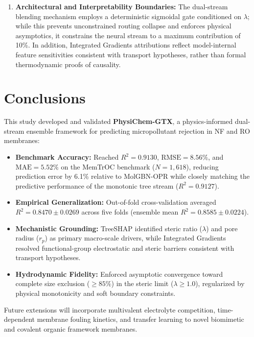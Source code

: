 \documentclass[10pt,twocolumn]{article}
\newcommand{\rsq}{R^{2}}
\begin{document}
\begin{enumerate}[leftmargin=1.3em,itemsep=2pt,topsep=2pt]
\item \textbf{Architectural and Interpretability Boundaries:} The dual-stream blending mechanism employs a deterministic sigmoidal gate conditioned on $\lambda$; while this prevents unconstrained routing collapse and enforces physical asymptotics, it constrains the neural stream to a maximum contribution of 10\%. In addition, Integrated Gradients attributions reflect model-internal feature sensitivities consistent with transport hypotheses, rather than formal thermodynamic proofs of causality.
\end{enumerate}

\section{Conclusions}
\label{sec:conclusions}

This study developed and validated \textbf{PhysiChem-GTX}, a physics-informed dual-stream ensemble framework for predicting micropollutant rejection in NF and RO membranes:
\begin{itemize}[leftmargin=1.3em,itemsep=2pt,topsep=3pt]
\item \textbf{Benchmark Accuracy:} Reached $\rsq = 0.9130$, $\mathrm{RMSE} = 8.56\%$, and $\mathrm{MAE} = 5.52\%$ on the MemTrOC benchmark ($N = 1{,}618$), reducing prediction error by 6.1\% relative to MolGBN-OPR while closely matching the predictive performance of the monotonic tree stream ($\rsq = 0.9127$).
\item \textbf{Empirical Generalization:} Out-of-fold cross-validation averaged $\rsq = 0.8470 \pm 0.0269$ across five folds (ensemble mean $\rsq = 0.8585 \pm 0.0224$).
\item \textbf{Mechanistic Grounding:} TreeSHAP identified steric ratio ($\lambda$) and pore radius ($r_p$) as primary macro-scale drivers, while Integrated Gradients resolved functional-group electrostatic and steric barriers consistent with transport hypotheses.
\item \textbf{Hydrodynamic Fidelity:} Enforced asymptotic convergence toward complete size exclusion ($\ge 85\%$) in the steric limit ($\lambda \geq 1.0$), regularized by physical monotonicity and soft boundary constraints.
\end{itemize}

Future extensions will incorporate multivalent electrolyte competition, time-dependent membrane fouling kinetics, and transfer learning to novel biomimetic and covalent organic framework membranes.
\end{document}
